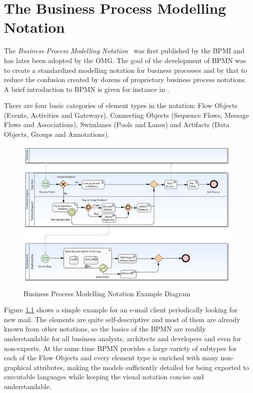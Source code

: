 %
%

\chapter{The Business Process Modelling Notation}
\label{sec:bpmn}

The \emph{Business Process Modelling Notation}~\cite{omg2009bpmn} was first published by the
BPMI and has later been adopted by the OMG. The goal of the development of BPMN was to create a
standardized modelling notation for business processes and by that to reduce the confusion created
by dozens of proprietary business process notations. A brief introduction to BPMN is given for
instance in~\cite{white2004introduction}.

There are four basic categories of element types in the notation: Flow Objects (Events, Activities
and Gateways), Connecting Objects (Sequence Flows, Message Flows and Associations), Swimlanes (Pools
and Lanes) and Artifacts (Data Objects, Groups and Annotations).

\begin{figure}[ht]
	\centering
	\includegraphics[width=.8\textwidth]{figures/bpmn/example.png}
	\caption{Business Process Modelling Notation Example Diagram}
	\label{fig:bpmn_example}
\end{figure}

Figure \ref{fig:bpmn_example} shows a simple example for an e-mail client periodically looking for
new mail. The elements are quite self-descriptive and most of them are already known from other
notations, so the basics of the BPMN are readily understandable for all business analysts,
architects and developers and even for non-experts. At the same time BPMN provides a large variety
of subtypes for each of the Flow Objects and every element type is enriched with many non-graphical
attributes, making the models sufficiently detailed for being exported to executable languages while
keeping the visual notation concise and understandable.

